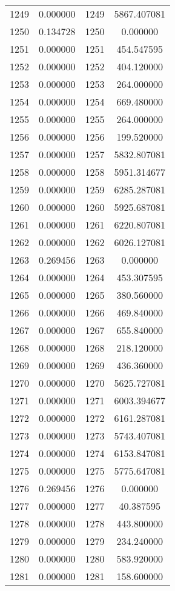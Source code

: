 \documentclass[12pt]{article}
\begin{document}
\begin{longtable}{@{}cccc@{}}
1249 & 0.000000 & 1249 & 5867.407081 \\
1250 & 0.134728 & 1250 & 0.000000 \\
1251 & 0.000000 & 1251 & 454.547595 \\
1252 & 0.000000 & 1252 & 404.120000 \\
1253 & 0.000000 & 1253 & 264.000000 \\
1254 & 0.000000 & 1254 & 669.480000 \\
1255 & 0.000000 & 1255 & 264.000000 \\
1256 & 0.000000 & 1256 & 199.520000 \\
1257 & 0.000000 & 1257 & 5832.807081 \\
1258 & 0.000000 & 1258 & 5951.314677 \\
1259 & 0.000000 & 1259 & 6285.287081 \\
1260 & 0.000000 & 1260 & 5925.687081 \\
1261 & 0.000000 & 1261 & 6220.807081 \\
1262 & 0.000000 & 1262 & 6026.127081 \\
1263 & 0.269456 & 1263 & 0.000000 \\
1264 & 0.000000 & 1264 & 453.307595 \\
1265 & 0.000000 & 1265 & 380.560000 \\
1266 & 0.000000 & 1266 & 469.840000 \\
1267 & 0.000000 & 1267 & 655.840000 \\
1268 & 0.000000 & 1268 & 218.120000 \\
1269 & 0.000000 & 1269 & 436.360000 \\
1270 & 0.000000 & 1270 & 5625.727081 \\
1271 & 0.000000 & 1271 & 6003.394677 \\
1272 & 0.000000 & 1272 & 6161.287081 \\
1273 & 0.000000 & 1273 & 5743.407081 \\
1274 & 0.000000 & 1274 & 6153.847081 \\
1275 & 0.000000 & 1275 & 5775.647081 \\
1276 & 0.269456 & 1276 & 0.000000 \\
1277 & 0.000000 & 1277 & 40.387595 \\
1278 & 0.000000 & 1278 & 443.800000 \\
1279 & 0.000000 & 1279 & 234.240000 \\
1280 & 0.000000 & 1280 & 583.920000 \\
1281 & 0.000000 & 1281 & 158.600000 \\

\end{longtable}
\end{document}
